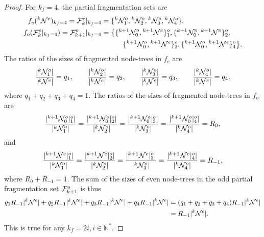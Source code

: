 \begin{proof}
  For $k_f = 4$, the partial fragmentation sets are
  \begin{align*}
    f_e({}^{k}\mathcal{N}^e)_{k_f = 4}
    = \mathcal{F}^e_{k}|_{k_f = 4}
     & =\{ {}^{k}\mathcal{N}^{o}_1, {}^{k}\mathcal{N}^{o}_2,  {}^{k}\mathcal{N}^{o}_3,{}^{k}\mathcal{N}^{o}_4\}, \\
    f_o(\mathcal{F}^e_{k}|_{k_f = 4})
    = \mathcal{F}^o_{k+1} |_{k_f = 4}
     & = \big\{      \{ {}^{k+1}\mathcal{N}^{o}_0, {}^{k+1}\mathcal{N}^e\}^o_1,
    \{ {}^{k+1}\mathcal{N}^{o}_0, {}^{k+1}\mathcal{N}^e\}^o_2,                                         \\
     & \hspace{3em} \{ {}^{k+1}\mathcal{N}^{o}_0, {}^{k+1}\mathcal{N}^e\}^o_2,
    \{ {}^{k+1}\mathcal{N}^{o}_0, {}^{k+1}\mathcal{N}^e\}^o_4 \big\}.
  \end{align*}
  The ratios of the sizes of fragmented node-trees in $f_e$ are
  \begin{equation*}
    \frac{\lvert{}^{k} \mathcal{N}^{o}_1\rvert}{\lvert{}^{k}\mathcal{N}^e\rvert} = q_1, \hspace{2em}
    \frac{\lvert{}^{k} \mathcal{N}^{o}_2\rvert}{\lvert{}^{k}\mathcal{N}^e\rvert} = q_2, \hspace{2em}
    \frac{\lvert{}^{k} \mathcal{N}^{o}_3\rvert}{\lvert{}^{k}\mathcal{N}^e\rvert} = q_3, \hspace{2em}
    \frac{\lvert{}^{k} \mathcal{N}^{o}_4\rvert}{\lvert{}^{k}\mathcal{N}^e\rvert} = q_4,
  \end{equation*}
  where $ q_1 + q_2 + q_3 + q_4 = 1$. The ratios of the sizes of fragmented node-trees in $f_o$ are
  \begin{equation*}
    \frac{\lvert{}^{k+1}\mathcal{N}^o_0|^o_1\rvert}{\lvert{}^{k} \mathcal{N}^{o}_1\rvert} =
    \frac{\lvert{}^{k+1}\mathcal{N}^o_0|^o_2\rvert}{\lvert{}^{k} \mathcal{N}^{o}_2\rvert} =
    \frac{\lvert{}^{k+1}\mathcal{N}^o_0|^o_3\rvert}{\lvert{}^{k} \mathcal{N}^{o}_3\rvert} =
    \frac{\lvert{}^{k+1}\mathcal{N}^o_0|^o_4\rvert}{\lvert{}^{k} \mathcal{N}^{o}_4\rvert} = R_0,
  \end{equation*}
  and
  \begin{equation*}
    \frac{\lvert{}^{k+1}\mathcal{N}^e|^o_1\rvert}{\lvert{}^{k} \mathcal{N}^{o}_1\rvert} =
    \frac{\lvert{}^{k+1}\mathcal{N}^e|^o_2\rvert}{\lvert{}^{k} \mathcal{N}^{o}_2\rvert} =
    \frac{\lvert{}^{k+1}\mathcal{N}^e|^o_3\rvert}{\lvert{}^{k} \mathcal{N}^{o}_3\rvert} =
    \frac{\lvert{}^{k+1}\mathcal{N}^e|^o_4\rvert}{\lvert{}^{k} \mathcal{N}^{o}_4\rvert} = R_{-1},
  \end{equation*}
  where $R_0 + R_{-1} = 1$. The sum of the sizes of even node-trees in  the odd partial fragmentation set $\mathcal{F}^o_{k+1}$ is thus
  \begin{align*}
    q_1 R_{-1} \lvert{}^{k}\mathcal{N}^e\rvert + q_2 R_{-1} \lvert{}^{k}\mathcal{N}^e\rvert + q_3 R_{-1} \lvert{}^{k}\mathcal{N}^e\rvert + q_4 R_{-1} \lvert{}^{k}\mathcal{N}^e\rvert
     & = (q_1 + q_2 + q_3 + q_4 ) R_{-1} \lvert{}^{k}\mathcal{N}^e\rvert \\
     & = R_{-1} \lvert{}^{k}\mathcal{N}^e\rvert.
  \end{align*}
  This is true for any $k_f = 2i, i\in \mathbb{N}^*$.
\end{proof}

